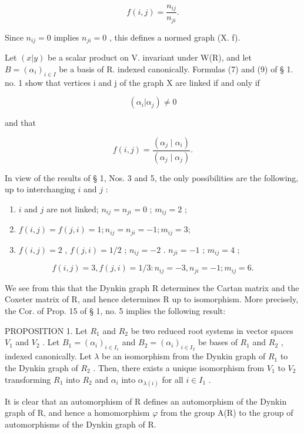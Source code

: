 \[
f (i, j) = \frac {n _ {i j}}{n _ {j i}}.
\]

Since \(n_{ij} = 0\) implies \(n_{ji} = 0\) , this defines a normed graph (X. f).

Let \((x|y)\) be a scalar product on V. invariant under W(R), and let \(B = (\alpha_i)_{i \in I}\) be a basis of R. indexed canonically. Formulas (7) and (9) of § 1. no. 1 show that vertices i and j of the graph X are linked if and only if

\[
(\alpha_ {i} | \alpha_ {j}) \neq 0
\]

and that

\[
f (i, j) = \frac {\left(\alpha_ {j} \mid \alpha_ {i}\right)}{\left(\alpha_ {j} \mid \alpha_ {j}\right)}.
\]

In view of the results of § 1, Nos. 3 and 5, the only possibilities are the following, up to interchanging \(i\) and \(j\) :

\begin{enumerate}
\def\labelenumi{\arabic{enumi})}
\item
  \(i\) and \(j\) are not linked; \(n_{ij} = n_{ji} = 0\) ; \(m_{ij} = 2\) ;
\item
  \(f(i,j) = f(j,i) = 1; n_{ij} = n_{ji} = -1; m_{ij} = 3;\)
\item
  \(f(i,j) = 2\) , \(f(j,i) = 1/2\) ; \(n_{ij} = -2\) . \(n_{ji} = -1\) ; \(m_{ij} = 4\) ;
\end{enumerate}

\[
f (i, j) = 3, f (j, i) = 1 / 3: n _ {i j} = - 3, n _ {j i} = - 1; m _ {i j} = 6.
\]

We see from this that the Dynkin graph R determines the Cartan matrix and the Coxeter matrix of R, and hence determines R up to isomorphism. More precisely, the Cor. of Prop. 15 of § 1, no. 5 implies the following result:

PROPOSITION 1. Let \(R_{1}\) and \(R_{2}\) be two reduced root systems in vector spaces \(V_{1}\) and \(V_{2}\) . Let \(B_{1} = (\alpha_{i})_{i \in I_{1}}\) and \(B_{2} = (\alpha_{i})_{i \in I_{2}}\) be bases of \(R_{1}\) and \(R_{2}\) , indexed canonically. Let \(\lambda\) be an isomorphism from the Dynkin graph of \(R_{1}\) to the Dynkin graph of \(R_{2}\) . Then, there exists a unique isomorphism from \(V_{1}\) to \(V_{2}\) transforming \(R_{1}\) into \(R_{2}\) and \(\alpha_{i}\) into \(\alpha_{\lambda(i)}\) for all \(i \in I_{1}\) .

It is clear that an automorphism of R defines an automorphism of the Dynkin graph of R, and hence a homomorphism \(\varphi\) from the group A(R) to the group of automorphisms of the Dynkin graph of R.

